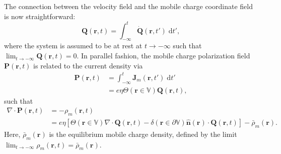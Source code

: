 \documentclass{article}
\begin{document}

The connection between the velocity field and the mobile charge coordinate field is now straightforward:
\begin{equation}
\mathbf{Q}(\mathbf{r},t) = \int_{-\infty}^t\dot{\mathbf{Q}}(\mathbf{r},t')\;\mathrm{d}t',
\end{equation}
where the system is assumed to be at rest at $t\to-\infty$ such that $\lim_{t\to-\infty}\mathbf{Q}(\mathbf{r},t) = 0$. In parallel fashion, the mobile charge polarization field $\mathbf{P}(\mathbf{r},t)$ is related to the current density via
\begin{equation}
\begin{split}
\mathbf{P}(\mathbf{r},t) &= \int_{-\infty}^t\mathbf{J}_m(\mathbf{r},t')\;\mathrm{d}t'\\
&= e\eta\Theta(\mathbf{r}\in\mathbb{V})\mathbf{Q}(\mathbf{r},t),
\end{split}
\end{equation}
such that
\begin{equation}
\begin{split}
\nabla\cdot\mathbf{P}(\mathbf{r},t) 
&= -\rho_m(\mathbf{r},t)\\
&= e\eta\left[\Theta(\mathbf{r}\in\mathbb{V})\nabla\cdot\mathbf{Q}(\mathbf{r},t) - \delta(\mathbf{r}\in\partial\mathbb{V})\hat{\mathbf{n}}(\mathbf{r})\cdot\mathbf{Q}(\mathbf{r},t)\right] - \bar{\rho}_m(\mathbf{r}).
\end{split}
\end{equation}
Here, $\bar{\rho}_m(\mathbf{r})$ is the equilibrium mobile charge density, defined by the limit $\lim_{t\to-\infty}\rho_m(\mathbf{r},t) = \bar{\rho}_m(\mathbf{r})$.

\end{document}
